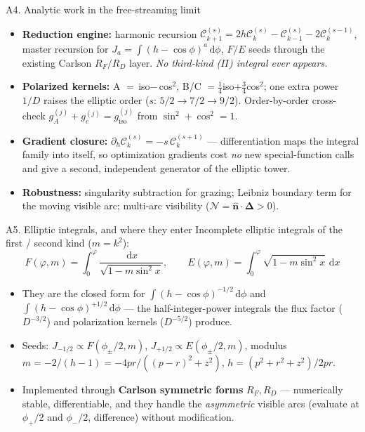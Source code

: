 \documentclass[aspectratio=169]{beamer}
\newcommand{\Del}{\bm{\Delta}}
\newcommand{\nhat}{\hat{\bm{n}}}
\newcommand{\dd}{\,\mathrm{d}}
\newcommand{\Ck}[2]{\mathcal{C}^{(#2)}_{#1}}
\newcommand{\Ja}[1]{J_{#1}}
\newcommand{\Fell}{F}
\newcommand{\Eell}{E}
\begin{document}
\begin{frame}{A4. Analytic work in the free-streaming limit}
  \small
  \begin{itemize}
    \item \textbf{Reduction engine:} harmonic recursion $\Ck{k+1}{s}=2h\Ck{k}{s}-\Ck{k-1}{s}-2\Ck{k}{s-1}$,
      master recursion for $\Ja{a}=\int(h-\cos\phi)^a\dd\phi$, $F/E$ seeds through the existing
      Carlson $R_F/R_D$ layer. \emph{No third-kind ($\Pi$) integral ever appears.}
    \item \textbf{Polarized kernels:} A $=\,$iso$-\,$cos$^2$, B/C $=\tfrac14$iso$+\tfrac34$cos$^2$;
      one extra power $1/D$ raises the elliptic order ($s$: $5/2\!\to\!7/2\!\to\!9/2$). Order-by-order
      cross-check $g_A^{(j)}+g_c^{(j)}=g_{\mathrm{iso}}^{(j)}$ from $\sin^2+\cos^2=1$.
    \item \textbf{Gradient closure:} $\partial_h\Ck{k}{s}=-s\,\Ck{k}{s+1}$ --- differentiation maps
      the integral family into itself, so optimization gradients cost \emph{no} new special-function
      calls and give a second, independent generator of the elliptic tower.
    \item \textbf{Robustness:} singularity subtraction for grazing; Leibniz boundary term for the
      moving visible arc; multi-arc visibility ($\mathcal{N}=\nhat\cdot\Del>0$).
  \end{itemize}
\end{frame}

\begin{frame}{A5. Elliptic integrals, and where they enter}
  \small
  Incomplete elliptic integrals of the first / second kind ($m=k^2$):
  \begin{equation*}
    \Fell(\varphi,m)=\int_0^{\varphi}\!\frac{\dd x}{\sqrt{1-m\sin^2 x}},\qquad
    \Eell(\varphi,m)=\int_0^{\varphi}\!\sqrt{1-m\sin^2 x}\,\dd x
  \end{equation*}
  \begin{itemize}
    \item They are the closed form for $\int (h-\cos\phi)^{-1/2}\dd\phi$ and
      $\int(h-\cos\phi)^{+1/2}\dd\phi$ --- the half-integer-power integrals the flux factor
      ($D^{-3/2}$) and polarization kernels ($D^{-5/2}$) produce.
    \item Seeds: $\Ja{-1/2}\propto \Fell(\phi_\pm/2,m)$, $\Ja{+1/2}\propto \Eell(\phi_\pm/2,m)$,
      modulus $m=-2/(h-1)=-4pr/((p-r)^2+z^2)$, $h=(p^2+r^2+z^2)/2pr$.
    \item Implemented through \textbf{Carlson symmetric forms} $R_F,R_D$ --- numerically stable,
      differentiable, and they handle the \emph{asymmetric} visible arcs (evaluate at $\phi_+/2$ and
      $\phi_-/2$, difference) without modification.
  \end{itemize}
\end{frame}
\end{document}
